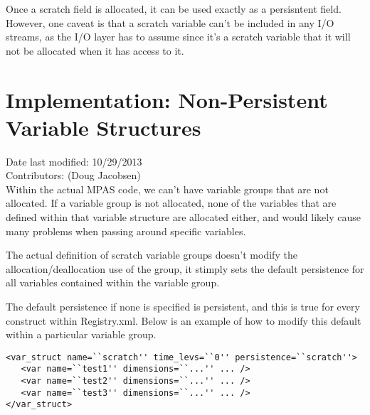 \documentclass[11pt]{report}
\begin{document}
Once a scratch field is allocated, it can be used exactly as a persisntent
field. However, one caveat is that a scratch variable can't be included in any
I/O streams, as the I/O layer has to assume since it's a scratch variable that
it will not be allocated when it has access to it.


%
%
%



\section{Implementation: Non-Persistent Variable Structures}
Date last modified: 10/29/2013 \\
Contributors: (Doug Jacobsen) \\

Within the actual MPAS code, we can't have variable groups that are not
allocated. If a variable group is not allocated, none of the variables that are
defined within that variable structure are allocated either, and would likely
cause many problems when passing around specific variables.

The actual definition of scratch variable groups doesn't modify the
allocation/deallocation use of the group, it stimply sets the default
persistence for all variables contained within the variable group.

The default persistence if none is specified is persistent, and this is true
for every construct within Registry.xml. Below is an example of how to modify
this default within a particular variable group.

\begin{lstlisting}
<var_struct name=``scratch'' time_levs=``0'' persistence=``scratch''>
   <var name=``test1'' dimensions=``...'' ... />
   <var name=``test2'' dimensions=``...'' ... />
   <var name=``test3'' dimensions=``...'' ... />
</var_struct>
\end{lstlisting}
\end{document}
